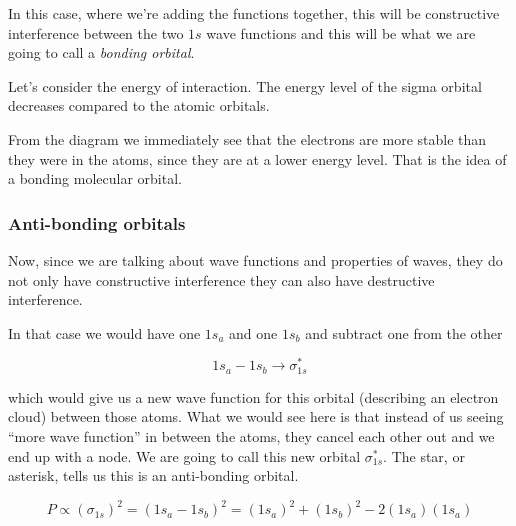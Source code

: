 \documentclass[../mit-general-chemistry.tex]{subfiles}
\begin{document}
In this case, where we're adding the functions together, this will be
constructive interference between the two $1s$ wave functions and this
will be what we are going to call a {\em bonding orbital}.


Let's consider the energy of interaction. The energy level of the
sigma orbital decreases compared to the atomic orbitals.


\begin{center}
  \begin{MOdiagram}[names,labels,labels-fs=\footnotesize]
    \EnergyAxis[title=$E$]
  \end{MOdiagram}
\end{center}


From the diagram we immediately see that the electrons are more stable
than they were in the atoms, since they are at a lower energy
level. That is the idea of a bonding molecular orbital.









\subsubsection{Anti-bonding orbitals}


Now, since we are talking about wave functions and properties of
waves, they do not only have constructive interference they can also
have destructive interference.

In that case we would have one $1s_a$ and one $1s_b$ and subtract one
from the other


\begin{equation*}
  1s_a - 1s_b \longrightarrow \sigma^*_{1s}
\end{equation*}

which would give us a new wave function for this orbital (describing
an electron cloud) between those atoms. What we would see here is that
instead of us seeing ``more wave function'' in between the atoms, they
cancel each other out and we end up with a node. We are going to call
this new orbital $\sigma^*_{1s}$. The star, or asterisk, tells us this
is an anti-bonding orbital.

\begin{equation*}
  P \propto (\sigma_{1s})^2 = (1s_a - 1s_b)^2 = (1s_a)^2 + (1s_b)^2 - 2(1s_a)(1s_a)
\end{equation*}
\end{document}
